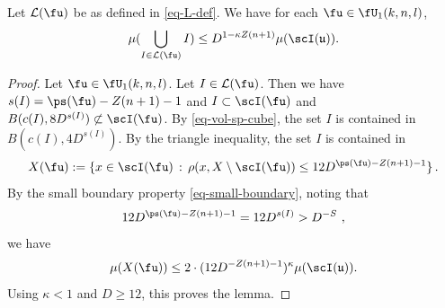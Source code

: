\begin{lemma}
\label{boundary-exception}
\leanok
{}

Let $\mathcal{L}(\fu)$ be as defined in \eqref{eq-L-def}. We have for each $\fu\in \fU_1(k,n,l)$,
\begin{equation}
\mu(\bigcup_{I\in \mathcal{L}(\fu)} I)
\le D^{1-\kappa Z(n+1)}
        \mu(\scI(\mathfrak{u})).
\end{equation}
\end{lemma}
\begin{proof}
\leanok
Let $\fu\in \fU_1(k,n,l)$.
Let $I \in \mathcal{L}(\fu)$. Then we have $s(I) = \ps(\fu) - Z(n+1) - 1$ and $I \subset \scI(\fu)$ and $B(c(I), 8D^{s(I)}) \not \subset \scI(\fu)$.
By \eqref{eq-vol-sp-cube}, the set $I$
is contained in $B(c(I), 4D^{s(I)})$.
By the triangle inequality, the set $I$
is contained in
\begin{equation}
    X(\fu):=\{x \in \scI(\fu) \, : \, \rho(x, X \setminus \scI(\fu)) \leq 12 D^{\ps(\fu) - Z(n+1)-1}\}\,.
\end{equation}
 By the small boundary property \eqref{eq-small-boundary}, noting that
 \begin{equation*}
     12D^{\ps(\fu) - Z(n+1) - 1} = 12D^{s(I)} > D^{-S}\ ,
 \end{equation*} we have
   $$
        \mu(X(\fu)) \le
        2\cdot(12 D^{-Z(n+1)-1})^\kappa
        \mu(\scI(\mathfrak{u})).
    $$
Using $\kappa<1$ and $D \ge 12$, this proves the lemma.
\end{proof}

